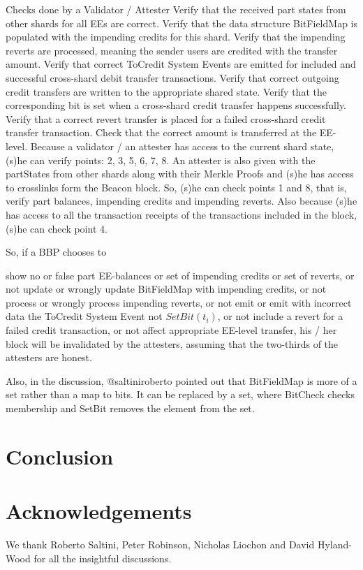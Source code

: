 \documentclass{article}
\begin{document}
Checks done by a Validator / Attester
Verify that the received part states from other shards for all EEs are correct.
Verify that the data structure BitFieldMap is populated with the impending credits for this shard.
Verify that the impending reverts are processed, meaning the sender users are credited with the transfer amount.
Verify that correct ToCredit System Events are emitted for included and successful cross-shard debit transfer transactions.
Verify that correct outgoing credit transfers are written to the appropriate shared state.
Verify that the corresponding bit is set when a cross-shard credit transfer happens successfully.
Verify that a correct revert transfer is placed for a failed cross-shard credit transfer transaction.
Check that the correct amount is transferred at the EE-level.
Because a validator / an attester has access to the current shard state, (s)he can verify points: 2, 3, 5, 6, 7, 8. An attester is also given with the partStates from other shards along with their Merkle Proofs and (s)he has access to crosslinks form the Beacon block. So, (s)he can check points 1 and 8, that is, verify part balances, impending credits and impending reverts. Also because (s)he has access to all the transaction receipts of the transactions included in the block, (s)he can check point 4.

So, if a BBP chooses to

show no or false
part EE-balances or
set of impending credits or
set of reverts, or
not update or wrongly update BitFieldMap with impending credits, or
not process or wrongly process impending reverts, or
not emit or emit with incorrect data the ToCredit System Event
not $SetBit(t_i)$, or
not include a revert for a failed credit transaction, or
not affect appropriate EE-level transfer,
his / her block will be invalidated by the attesters, assuming that the two-thirds of the attesters are honest.

Also, in the discussion, @saltiniroberto pointed out that BitFieldMap is more of a set rather than a map to bits. It can be replaced by a set, where BitCheck checks membership and SetBit removes the element from the set.

\section{Conclusion}

\section*{Acknowledgements}
We thank Roberto Saltini, Peter Robinson, Nicholas Liochon and David Hyland-Wood for all the insightful discussions.



\end{document}
